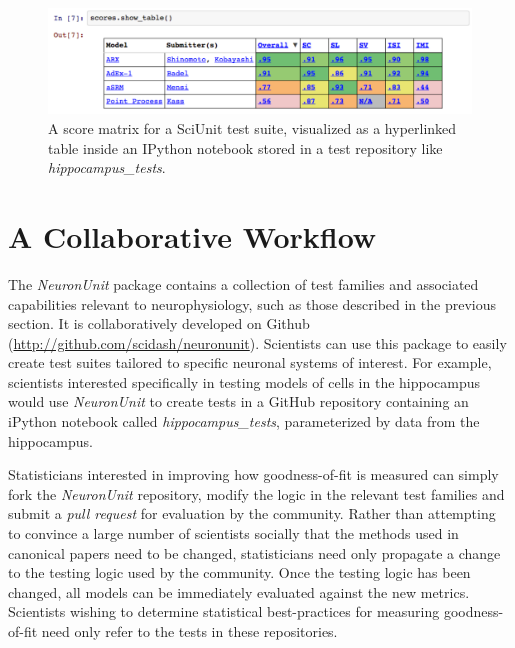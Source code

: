\documentclass{frontiersSCNS}
\begin{document}
\begin{figure}%
\centering
\includegraphics[scale=0.55]{table-ipy.pdf}
\vspace{-10px}
\caption{A score matrix for a SciUnit test suite, visualized as a hyperlinked table inside an IPython notebook stored in a test repository like \textit{hippocampus\_tests}.}
\label{fig:scidash_matrix}
\vspace{5px}
\end{figure}

\section{A Collaborative Workflow}\label{sec:neuronunit_acitivities}
The \textit{NeuronUnit} package contains a collection of test families and associated capabilities relevant to neurophysiology, such as those described in the previous section. 
It is collaboratively developed on Github (\url{http://github.com/scidash/neuronunit}). 
Scientists can use this package to easily create test suites tailored to specific neuronal systems of interest. 
For example, scientists interested specifically in testing models of cells in the hippocampus would use \textit{NeuronUnit} to create tests in a GitHub repository containing an iPython notebook called \textit{hippocampus\_tests}, parameterized by data from the hippocampus.%

Statisticians interested in improving how goodness-of-fit is measured can simply fork the \textit{NeuronUnit} repository, modify the logic in the relevant test families and submit a \emph{pull request} for evaluation by the community. 
Rather than attempting to convince a large number of scientists socially that the methods used in canonical papers need to be changed, statisticians need only propagate a change to the testing logic used by the community. 
Once the testing logic has been changed, all models can be immediately evaluated against the new metrics. 
Scientists wishing to determine statistical best-practices for measuring goodness-of-fit need only refer to the tests in these repositories.
\end{document}
